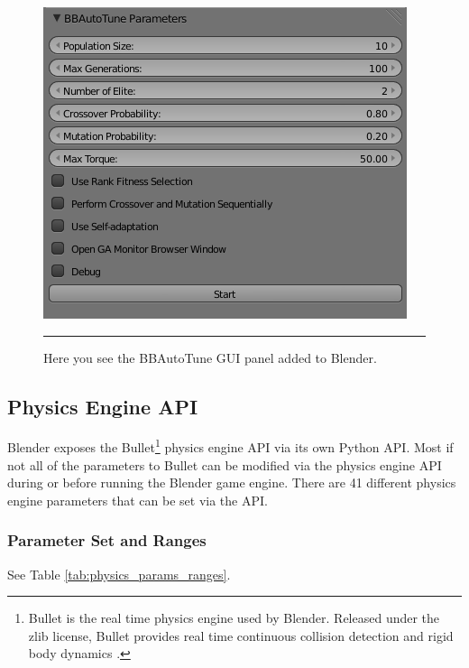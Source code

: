 \begin{figure}[htbp]
\centering
\includegraphics[scale=0.6]{../Figures/Chapter4/bbautotune_gui.png}
\rule{35em}{0.5pt}
\caption[BBAutoTune GUI Panel]{Here you see the BBAutoTune GUI panel added to Blender.}
\label{fig:bbautotune_gui}
\end{figure}

\subsection{Physics Engine API}

Blender exposes the Bullet\footnote{Bullet is the real time physics engine used by Blender. Released under the zlib license, Bullet provides real time continuous collision detection and rigid body dynamics \cite{website:continuousphysics}.} physics engine API via its own Python API. Most if not all of the parameters to Bullet can be modified via the physics engine API during or before running the Blender game engine. There are 41 different physics engine parameters that can be set via the API.

\subsubsection{Parameter Set and Ranges}

See Table \ref{tab:physics_params_ranges}.

